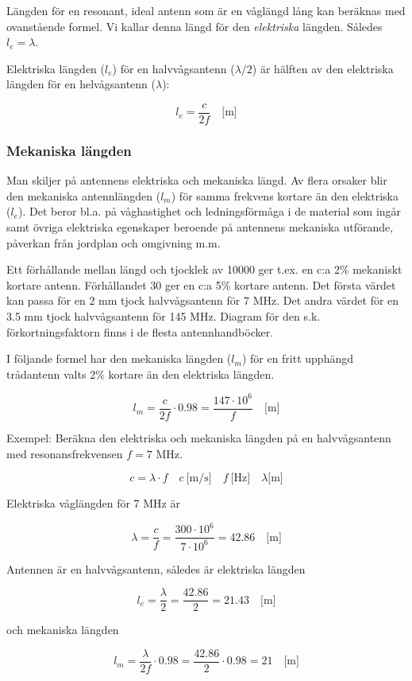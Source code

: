 Längden för en resonant, ideal antenn som är en våglängd lång kan
beräknas med ovanstående formel. Vi kallar denna längd för den
\emph{elektriska} längden. Således \(l_e = \lambda\).

Elektriska längden (\(l_e\)) för en halvvågsantenn (\(\lambda/2\))
är hälften av den elektriska längden för en helvågsantenn
(\(\lambda\)):

\[l_e = \frac{c}{2f} \quad \text{[m]}\]

\subsubsection{Mekaniska längden}

Man skiljer på antennens elektriska och mekaniska längd. Av flera
orsaker blir den mekaniska antennlängden (\(l_m\)) för samma
frekvens kortare än den elektriska (\(l_e\)). Det beror bl.a. på
våghastighet och ledningsförmåga i de material som ingår samt övriga
elektriska egenskaper beroende på antennens mekaniska utförande,
påverkan från jordplan och omgivning m.m.

Ett förhållande mellan längd och tjocklek av 10000 ger t.ex. en c:a
2\% mekaniskt kortare antenn. Förhållandet 30 ger en c:a 5\% kortare
antenn. Det första värdet kan passa för en 2 mm tjock halvvågsantenn
för 7 MHz. Det andra värdet för en 3.5 mm tjock halvvågsantenn för 145
MHz. Diagram för den s.k. förkortningsfaktorn finns i de flesta
antennhandböcker.

I följande formel har den mekaniska längden (\(l_m\)) för en fritt upphängd
trådantenn valts 2\% kortare än den elektriska längden.

\[l_m = \frac{c}{2f} \cdot 0.98 = \frac{147\cdot 10^6}{f} \quad \text{[m]}\]

Exempel: Beräkna den elektriska och mekaniska längden på en halvvågsantenn med
resonansfrekvensen \(f = 7\) MHz.

\[
c = \lambda \cdot f
\quad c\ \text{[m/s]} \quad f\ \text{[Hz]} \quad \lambda \text{[m]}
\]

Elektriska våglängden för 7 MHz är

\[
\lambda = \frac{c}{f} = \frac{300 \cdot 10^6}{7 \cdot 10^6} = 42.86
\quad \text{[m]}
\]

Antennen är en halvvågsantenn, således är elektriska längden

\[
l_e = \frac{\lambda}{2} = \frac{42.86}{2} = 21.43 \quad \text{[m]}
\]

och mekaniska längden

\[
l_m = \frac{\lambda}{2f} \cdot 0.98 = \frac{42.86}{2}\cdot 0.98 = 21
\quad \text{[m]}
\]

